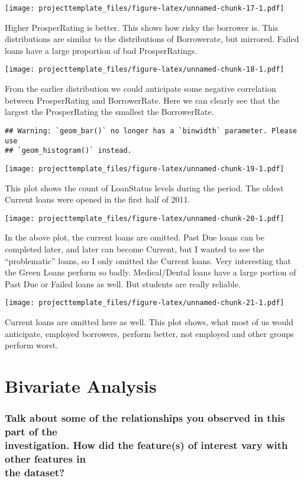 \documentclass[]{article}
\begin{document}
\texttt{[image: projecttemplate\_files/figure-latex/unnamed-chunk-17-1.pdf]}

Higher ProsperRating is better. This shows how risky the borrower is.
This distributions are similar to the distributions of Borrowerate, but
mirrored. Failed loans have a large proportion of bad ProsperRatings.

\texttt{[image: projecttemplate\_files/figure-latex/unnamed-chunk-18-1.pdf]}

From the earlier distribution we could anticipate some negative
correlation between ProsperRating and BorrowerRate. Here we can clearly
see that the largest the ProsperRating the smallest the BorrowerRate.

\begin{verbatim}
## Warning: `geom_bar()` no longer has a `binwidth` parameter. Please use
## `geom_histogram()` instead.
\end{verbatim}

\texttt{[image: projecttemplate\_files/figure-latex/unnamed-chunk-19-1.pdf]}

This plot shows the count of LoanStatus levels during the period. The
oldest Current loans were opened in the first half of 2011.

\texttt{[image: projecttemplate\_files/figure-latex/unnamed-chunk-20-1.pdf]}

In the above plot, the current loans are omitted. Past Due loans can be
completed later, and later can become Current, but I wanted to see the
``problematic'' loans, so I only omitted the Current loans. Very
interesting that the Green Loans perform so badly. Medical/Dental loans
have a large portion of Past Due or Failed loans as well. But students
are really reliable.

\texttt{[image: projecttemplate\_files/figure-latex/unnamed-chunk-21-1.pdf]}

Current loans are omitted here as well. This plot shows, what most of us
would anticipate, employed borrowers, perform better, not employed and
other groups perform worst.

\section{Bivariate Analysis}\label{bivariate-analysis}

\subsubsection{\texorpdfstring{Talk about some of the relationships you
observed in this part of the\\
investigation. How did the feature(s) of interest vary with other
features in\\
the
dataset?}{Talk about some of the relationships you observed in this part of the investigation. How did the feature(s) of interest vary with other features in the dataset?}}\label{talk-about-some-of-the-relationships-you-observed-in-this-part-of-the-investigation.-how-did-the-features-of-interest-vary-with-other-features-in-the-dataset}
\end{document}
